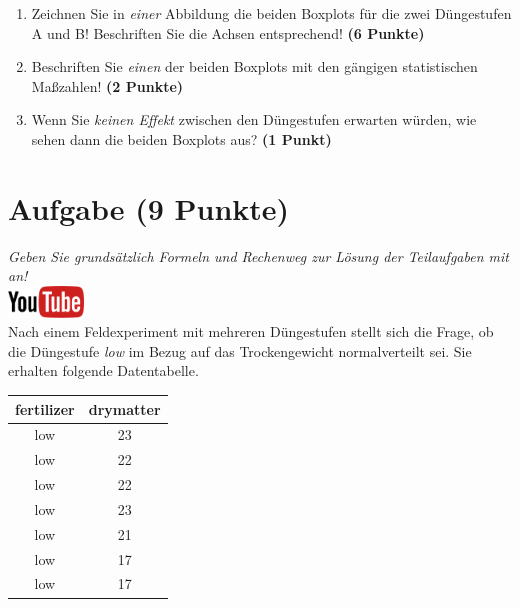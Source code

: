\documentclass[a4paper, 10pt]{scrartcl}\usepackage[]{graphicx}\usepackage[]{xcolor}
\begin{document}
\begin{enumerate}
\item Zeichnen Sie in \textit{einer} Abbildung die beiden Boxplots f{\"u}r die
  zwei D{\"u}ngestufen A und B! Beschriften Sie die Achsen entsprechend!
  \textbf{(6 Punkte)}
\item Beschriften Sie \textit{einen} der beiden Boxplots mit den g{\"a}ngigen
  statistischen Ma{\ss}zahlen! \textbf{(2 Punkte)}
\item Wenn Sie \textit{keinen Effekt} zwischen den D{\"u}ngestufen erwarten
  w{\"u}rden, wie sehen dann die beiden Boxplots aus? \textbf{(1 Punkt)}
\end{enumerate} 
\clearpage

\section{Aufgabe \hfill (9 Punkte)}

\textit{Geben Sie grunds{\"a}tzlich Formeln und Rechenweg zur L{\"o}sung der
  Teilaufgaben mit an!} \\[1Ex]

\hfill\href{https://youtu.be/VX4Hs81h8_A}{\includegraphics[width =
  2cm]{img/youtube}}\\[1Ex]

Nach einem Feldexperiment mit mehreren D{\"u}ngestufen stellt sich die Frage,
ob die D{\"u}ngestufe \textit{low} im Bezug auf das Trockengewicht
normalverteilt sei. Sie erhalten folgende Datentabelle.

\begin{table}[!h]
\centering
\begin{tabular}{cc}
\toprule
fertilizer & drymatter\\
\midrule
low & 23\\
low & 22\\
low & 22\\
low & 23\\
low & 21\\
\addlinespace
low & 17\\
low & 17\\
\bottomrule
\end{tabular}
\end{table}
\end{document}
